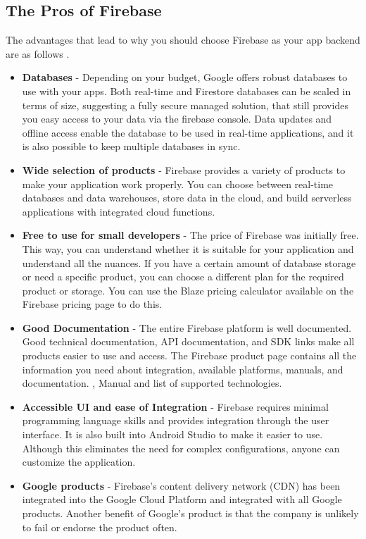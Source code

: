 \subsection{The Pros of Firebase}
The advantages that lead to why you should choose Firebase as your app backend are as follows \cite{firebaseprosandcons:online}. 
\begin{itemize}
    \item \textbf{Databases} - Depending on your budget, Google offers robust databases to use with your apps. Both real-time and Firestore databases can be scaled in terms of size, suggesting a fully secure managed solution, that still provides you easy access to your data via the firebase console. Data updates and offline access enable the database to be used in real-time applications, and it is also possible to keep multiple databases in sync.
    \item \textbf{Wide selection of products} - Firebase provides a variety of products to make your application work properly. You can choose between real-time databases and data warehouses, store data in the cloud, and build serverless applications with integrated cloud functions.
    \item \textbf{Free to use for small developers} - The price of Firebase was initially free. This way, you can understand whether it is suitable for your application and understand all the nuances. If you have a certain amount of database storage or need a specific product, you can choose a different plan for the required product or storage. You can use the Blaze pricing calculator available on the Firebase pricing page to do this.
    \item \textbf{Good Documentation} - The entire Firebase platform is well documented. Good technical documentation, API documentation, and SDK links make all products easier to use and access. The Firebase product page contains all the information you need about integration, available platforms, manuals, and documentation. , Manual and list of supported technologies.
    \item \textbf{Accessible UI and ease of Integration} - Firebase requires minimal programming language skills and provides integration through the user interface. It is also built into Android Studio to make it easier to use. Although this eliminates the need for complex configurations, anyone can customize the application.
    \item \textbf{Google products} - Firebase's content delivery network (CDN) has been integrated into the Google Cloud Platform and integrated with all Google products. Another benefit of Google’s product is that the company is unlikely to fail or endorse the product often.
\end{itemize}

